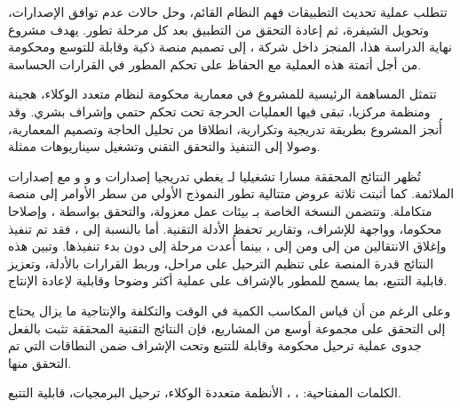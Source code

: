 \thispagestyle{plain}

\begin{center}
{\Huge\bfseries{}}
\end{center}

\vspace{0.6cm}

\normalsize
{}

\begin{arabtext}
تتطلب عملية تحديث التطبيقات فهم النظام القائم، وحل حالات عدم توافق الإصدارات، وتحويل الشيفرة، ثم إعادة التحقق من التطبيق بعد كل مرحلة تطور. يهدف مشروع نهاية الدراسة هذا، المنجز داخل شركة ، إلى تصميم منصة  ذكية وقابلة للتوسع ومحكومة من أجل أتمتة هذه العملية مع الحفاظ على تحكم المطور في القرارات الحساسة.

تتمثل المساهمة الرئيسية للمشروع في معمارية محكومة لنظام متعدد الوكلاء، هجينة ومنظمة مركزيا، تبقى فيها العمليات الحرجة تحت تحكم حتمي وإشراف بشري. وقد أُنجز المشروع بطريقة تدريجية وتكرارية، انطلاقا من تحليل الحاجة وتصميم المعمارية، وصولا إلى التنفيذ والتحقق التقني وتشغيل سيناريوهات ممثلة.

تُظهر النتائج المحققة مسارا تشغيليا لـ  يغطي تدريجيا إصدارات  و و و مع إصدارات  الملائمة. كما أثبتت ثلاثة عروض متتالية تطور النموذج الأولي من سطر الأوامر إلى منصة  متكاملة. وتتضمن النسخة الخاصة بـ  بيئات عمل معزولة، والتحقق بواسطة ، وإصلاحا محكوما، وواجهة للإشراف، وتقارير تحفظ الأدلة التقنية. أما بالنسبة إلى ، فقد تم تنفيذ وإغلاق الانتقالين من  إلى  ومن  إلى ، بينما أُعدت مرحلة  إلى  دون بدء تنفيذها. وتبين هذه النتائج قدرة المنصة على تنظيم الترحيل على مراحل، وربط القرارات بالأدلة، وتعزيز قابلية التتبع، بما يسمح للمطور بالإشراف على عملية أكثر وضوحا وقابلية لإعادة الإنتاج.

وعلى الرغم من أن قياس المكاسب الكمية في الوقت والتكلفة والإنتاجية ما يزال يحتاج إلى التحقق على مجموعة أوسع من المشاريع، فإن النتائج التقنية المحققة تثبت بالفعل جدوى عملية ترحيل محكومة وقابلة للتتبع وتحت الإشراف ضمن النطاقات التي تم التحقق منها.

الكلمات المفتاحية: ، ، الأنظمة متعددة الوكلاء، ترحيل البرمجيات، قابلية التتبع.
\end{arabtext}

\normalsize
{}
